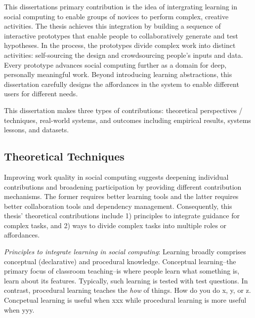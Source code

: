 This dissertation\textquotesingle s primary contribution is the idea of intergrating learning in social computing to enable groups of novices to perform complex, creative activities. The thesis achieves this integration by building a sequence of interactive prototypes that enable people to collaboratively generate and test hypotheses. In the process, the prototypes divide complex work into distinct activities: self-sourcing the design and crowdsourcing people's inputs and data. Every prototype advances social computing further as a domain for deep, personally meaningful work. Beyond introducing learning abstractions, this dissertation carefully designs the affordances in the system to enable different users for different needs. 

This dissertation makes three types of contributions: theoretical perspectives / techniques, real-world systems, and outcomes including empirical results, systems lessons, and datasets. 

\subsection{Theoretical  Techniques}
Improving  work quality in social computing suggests deepening individual contributions and broadening participation by providing different contribution mechanisms. The former requires better learning tools and the latter requires better collaboration tools and dependency management. Consequently, this thesis' theoretical contributions include 1) principles to integrate guidance for complex tasks, and 2) ways to divide complex tasks into multiple roles or affordances.


\textit{Principles to integrate learning in social computing}: Learning broadly comprises conceptual (declarative) and procedural knowledge. Conceptual learning--the primary focus of classroom teaching--is where people learn what something is, learn about its features. Typically, such learning is tested with test questions. In contrast, procedural learning teaches the {\it how} of things. How do you do x, y, or z.  Concpetual learning is useful when xxx while procedural learning is more useful when yyy.

